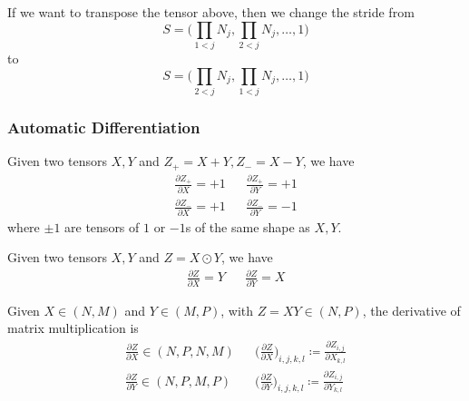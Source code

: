     \begin{example}[Transposing]
      If we want to transpose the tensor above, then we change the stride from 
      \begin{equation}
        S = \bigg( \prod_{1 < j} N_j , \prod_{2 < j} N_j, \ldots, 1 \bigg)
      \end{equation} 
      to 
      \begin{equation}
        S = \bigg( \prod_{2 < j} N_j , \prod_{1 < j} N_j, \ldots, 1 \bigg)
      \end{equation} 
    \end{example}

  \subsubsection{Automatic Differentiation} 

    \begin{lemma}[Derivative of $+/-$]
      Given two tensors $X, Y$ and $Z_+ = X + Y, Z_{-} = X - Y$, we have 
      \begin{align}
        \frac{\partial Z_+}{\partial X} = +1 && \frac{\partial Z_+}{\partial Y} = +1 \\ 
        \frac{\partial Z_-}{\partial X} = +1 && \frac{\partial Z_-}{\partial Y} = -1 
      \end{align}
      where $\pm1$ are tensors of $1$ or $-1$s of the same shape as $X, Y$. 
    \end{lemma}

    \begin{lemma}
      Given two tensors $X, Y$ and $Z = X \odot Y$, we have 
      \begin{align}
        \frac{\partial Z}{\partial X} = Y && \frac{\partial Z}{\partial Y} = X
      \end{align}
    \end{lemma} 

    \begin{lemma}
      Given $X \in (N, M)$ and $Y \in (M, P)$, with $Z = XY \in (N, P)$, the derivative of matrix multiplication is 
      \begin{align}
        \frac{\partial Z}{\partial X} \in (N, P, N, M) && \bigg( \frac{\partial Z}{\partial X} \bigg)_{i, j, k, l} \coloneqq \frac{\partial Z_{i, j}}{\partial X_{k, l}} \\
        \frac{\partial Z}{\partial Y} \in (N, P, M, P) && \bigg( \frac{\partial Z}{\partial Y} \bigg)_{i, j, k, l} \coloneqq \frac{\partial Z_{i, j}}{\partial Y_{k, l}} 
      \end{align} 
    \end{lemma} 

